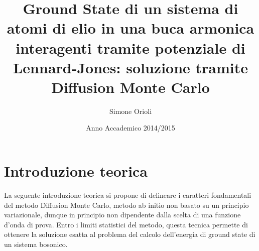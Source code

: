 \documentclass[11pt,a4paper]{article}
\begin{document}
\title{Ground State di un sistema di atomi di elio in una buca armonica interagenti tramite potenziale di Lennard-Jones: soluzione tramite Diffusion Monte Carlo} 
\author{Simone Orioli} 
\date{Anno Accademico 2014/2015} 
\maketitle
\tableofcontents
\newpage

\section{Introduzione teorica}
La seguente introduzione teorica si propone di delineare i caratteri fondamentali del metodo Diffusion Monte Carlo, metodo ab initio non basato su un principio variazionale, dunque in principio non dipendente dalla scelta di una funzione d'onda di prova. Entro i limiti statistici del metodo, questa tecnica permette di ottenere la soluzione esatta al problema del calcolo dell'energia di ground state di un sistema bosonico. 
\end{document}
